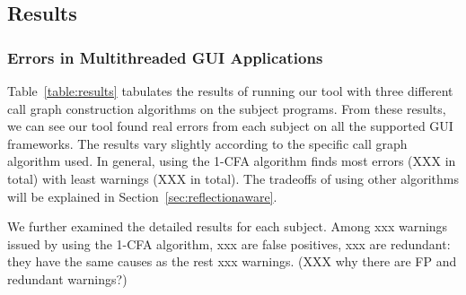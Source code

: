 \begin{table*}[ht]
\begin{center}
\begin{tabular}{|l||c|c|c||c|c|c||c|c|c||c|c|}
\hline
\end{tabular}
\end{center}
\vspace{-15pt}
\end{table*}

\subsection{Results}
\label{sec:results}


\subsubsection{Errors in Multithreaded GUI Applications}
\label{sec:errors}

Table~\ref{table:results} tabulates the results of running our
tool with three different call graph construction algorithms
on the subject programs. From these results, we can see our
tool found real errors from each subject on all the 
supported GUI frameworks. The results vary slightly according
to the specific call graph algorithm used. In general, using
the 1-CFA algorithm finds most errors (XXX in total) with least
warnings (XXX in total). The tradeoffs of using other
algorithms will be explained in Section~\ref{sec:reflectionaware}.

We further examined the detailed results for each subject.
Among xxx warnings issued by using the 1-CFA algorithm, xxx
are false positives, xxx are redundant:
they have the same causes as the rest xxx warnings. (XXX why there
are FP and redundant warnings?)

